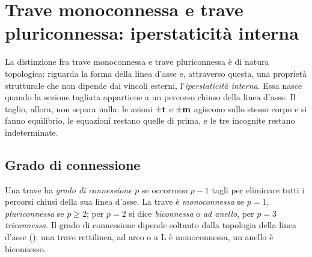 \section{Trave monoconnessa e trave pluriconnessa: iperstaticità interna}
\label{sec:connessione}

La distinzione fra trave monoconnessa e trave
pluriconnessa è di natura topologica: riguarda la forma
della linea d'asse e, attraverso questa, una proprietà
strutturale che non dipende dai vincoli esterni,
l'\emph{iperstaticità interna}. Essa nasce quando la
sezione tagliata appartiene a un percorso chiuso della
linea d'asse. Il taglio, allora,
non separa nulla: le azioni $\pm\mathbf{t}$ e $\pm\mathbf{m}$ agiscono
sullo stesso corpo e si fanno equilibrio, le equazioni
restano quelle di prima, e le tre incognite restano
indeterminate.

\subsection{Grado di connessione}
\label{sec:grado_connessione}

Una trave ha \emph{grado di connessione}
$p$ se occorrono $p-1$ tagli per eliminare tutti i
percorsi chiusi della sua linea d'asse. La trave è
\emph{monoconnessa}
se $p = 1$, \emph{pluriconnessa}
se $p \geq 2$; per $p = 2$ si dice
\emph{biconnessa} o
\emph{ad anello}, per
$p = 3$ \emph{triconnessa}.
Il grado di connessione dipende soltanto dalla topologia
della linea d'asse (): una
trave rettilinea, ad arco o a L è monoconnessa, un anello
è biconnesso.




